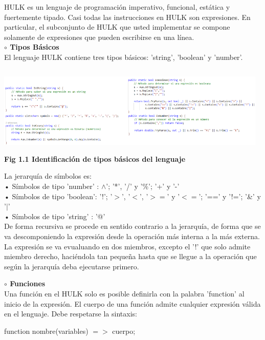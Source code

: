 \documentclass[letterpaper]{article}
\begin{document}
\newpage
{\small
HULK es un lenguaje de programación imperativo, funcional, estática y fuertemente tipado. Casi todas las instrucciones en HULK son expresiones. 
En particular, el subconjunto de HULK que usted implementar se compone solamente de expresiones que pueden escribirse en una línea. \\

\textbf{{\large $\circ $  Tipos Básicos}}\\

El lenguaje HULK contiene tres tipos básicos: 'string', 'boolean' y 'number'.

\begin{center}
	\includegraphics[width=13cm, height=4.25cm]{Imagenes/Types.png}\\
	{\scriptsize \textbf{Fig 1.1 Identificación de tipos básicos del lenguaje}}
\end{center}

La jerarquía de símbolos es: \\
• Símbolos de tipo 'number' : $\wedge$'; '*', '/' y '\%'; '+' y '-' \\
• Símbolos de tipo 'boolean':  '!'; '$>$', '$<$', '$>=$' y '$<=$'; '==' y '!='; '\&' y '$|$' \\
• Símbolos de tipo 'string' : '@' \\

De forma recursiva se procede en sentido contrario a la jerarquía, de forma que se va descomponiendo la expresión desde la operación más interna a la más externa.
La expresión se va evualuando en dos miembros, excepto el '!' que solo admite miembro derecho, haciéndola tan pequeña hasta que se llegue a la operación que según la 
jerarquía deba ejecutarse primero.

\begin{center}
\end{center}


\textbf{{\large $\circ $ Funciones}}\\

Una función en el HULK solo es posible definirla con la palabra 'function' al inicio de la expresión. El cuerpo de una función admite cualquier expresión válida en 
el lenguaje. Debe respetarse la sintaxis:
\begin{center}
	function nombre(variables) $=>$ cuerpo;
\end{center}

}
\end{document}
